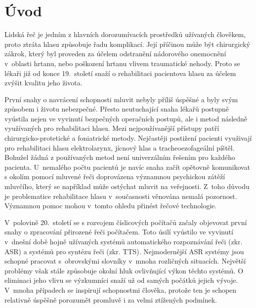 \chapter*{Úvod}
\label{chap:introduction}

Lidská řeč je jedním z hlavních dorozumívacích prostředků užívaných člověkem, proto
ztráta hlasu způsobuje řadu komplikací. Její příčinou může být chirurgický zákrok, který byl proveden za účelem odstranění nádorového onemocnění v~oblasti hrtanu, nebo
poškození hrtanu vlivem traumatické nehody. Proto se lékaři již od konce 19.~století snaží o rehabilitaci pacientova hlasu za účelem zvýšit kvalitu jeho života.

První snahy o navrácení schopnosti mluvit nebyly příliš úspěšné a byly svým
způsobem i životu nebezpečné. Přesto neutuchající snaha lékařů postupně
vyústila nejen ve vyvinutí bezpečných operačních postupů, ale i metod následně využívaných pro rehabilitaci hlasu. Mezi nejpoužívanější přístupy patří chirurgicko-protetické a foniatrické metody.
Nejčastěji postižení pacienti využivají pro rehabilitaci hlasu elektrolarynx, jícnový hlas a tracheoezofageální píštěl. Bohužel žádná z používaných metod není univerzálním řešením pro každého pacienta.
U~nemalého počtu pacientů je navíc snaha začít opětovně komunikovat s okolím pomocí mluvené řeči doprovázena významnou psychickou zátěží mluvčího, který se například může ostýchat mluvit na veřejnosti.
Z~toho důvodu je problematice rehabilitace hlasu v~současnosti věnována nemalá pozornost. Významnou pomoc mohou v~tomto ohledu přinést řečové technologie.

V~polovině 20.~století se s rozvojem číslicových počítačů začaly objevovat první
snahy o zpracování přirozené řeči počítačem. Toto úsilí vyústilo ve vyvinutí v~dnešní
době hojně užívaných systémů automatického rozpoznávání řeči (zkr. ASR) a systémů pro syntézu
řeči (zkr. TTS). Nejmodernější ASR systémy jsou schopné pracovat s~obrovskými
slovníky v~mnoha rozličných situacích. Největší problémy však stále způsobuje
okolní hluk ovlivňující výkon těchto systémů. O eliminaci jeho vlivu se
výzkumníci snaží už od samých počátků jejich vývoje. V~mnoha případech se
inspirují schopnostmi člověka, protože ten je schopen relativně úspěšně
porozumět promluvě i za velmi ztížených podmínek.

